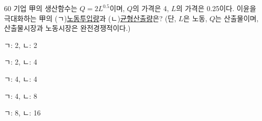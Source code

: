 \begin{question}{60}
기업 甲의 생산함수는 $Q=2L^{0.5}$이며, $Q$의 가격은 4, $L$의 가격은 0.25이다. 이윤을 극대화하는 甲의 (ㄱ)\uline{노동투입량}과 (ㄴ)\uline{균형산출량}은? (단, $L$은 노동, $Q$는 산출물이며, 산출물시장과 노동시장은 완전경쟁적이다.)
\begin{choices}
  \item ㄱ: 2, ㄴ: 2
  \item ㄱ: 2, ㄴ: 4
  \item ㄱ: 4, ㄴ: 4
  \item ㄱ: 4, ㄴ: 8
  \item ㄱ: 8, ㄴ: 16
\end{choices}
\end{question}
\answerall
{}
